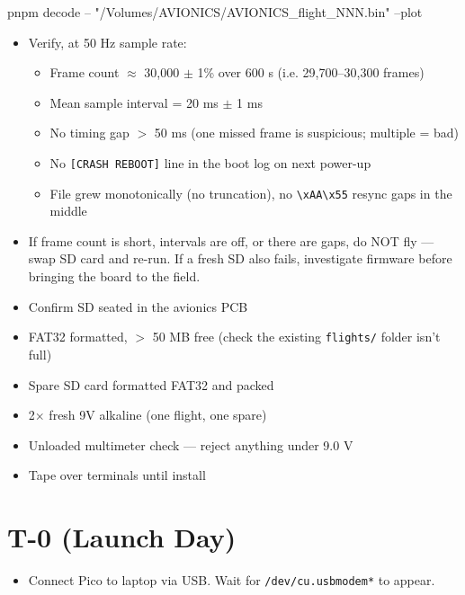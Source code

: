 \documentclass[11pt,a4paper,oneside]{report}
\begin{document}
\begin{codebox}
pnpm decode -- "/Volumes/AVIONICS/AVIONICS_flight_NNN.bin" --plot
\end{codebox}

\begin{itemize}
  \item Verify, at 50 Hz sample rate:
  \begin{itemize}
    \item Frame count $\approx$ 30,000 $\pm$ 1\% over 600 s (i.e. 29,700--30,300 frames)
    \item Mean sample interval = 20 ms $\pm$ 1 ms
    \item No timing gap $>$ 50 ms (one missed frame is suspicious; multiple = bad)
    \item No \texttt{[CRASH REBOOT]} line in the boot log on next power-up
    \item File grew monotonically (no truncation), no \texttt{\textbackslash xAA\textbackslash x55} resync gaps in the middle
  \end{itemize}
  \item If frame count is short, intervals are off, or there are gaps, do NOT fly --- swap SD card and re-run. If a fresh SD also fails, investigate firmware before bringing the board to the field.
\end{itemize}

\begin{itemize}
  \item Confirm SD seated in the avionics PCB
  \item FAT32 formatted, $>$ 50 MB free (check the existing \texttt{flights/} folder isn't full)
  \item Spare SD card formatted FAT32 and packed
\end{itemize}

\begin{itemize}
  \item 2$\times$ fresh 9V alkaline (one flight, one spare)
  \item Unloaded multimeter check --- reject anything under 9.0 V
  \item Tape over terminals until install
\end{itemize}

\section{T-0 (Launch Day)}

\begin{itemize}
  \item Connect Pico to laptop via USB. Wait for \texttt{/dev/cu.usbmodem*} to appear.
\end{itemize}
\end{document}
